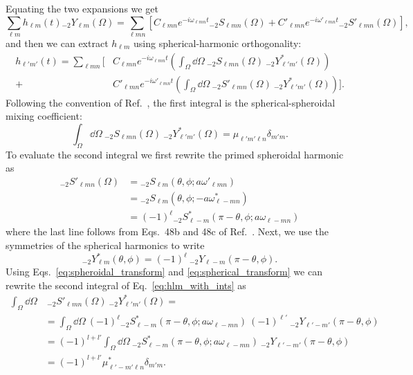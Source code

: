 Equating the two expansions we get
\begin{equation}
    \sum_{\ell m} h_{\ell m}(t) {}_{-2}Y_{\ell m}(\Omega) = \sum_{\ell m n} \left[ C_{\ell m n} e^{-i \omega_{\ell m n} t} {}_{-2}S_{\ell m n}(\Omega) + C'_{\ell m n} e^{-i \omega'_{\ell m n} t} {}_{-2}S'_{\ell m n}(\Omega) \right],
\end{equation}
and then we can extract $h_{\ell m}$ using spherical-harmonic orthogonality:
\begin{align}\label{eq:hlm_with_ints}
    h_{\ell' m'}(t) = \sum_{\ell m n} \bigg[ &C_{\ell m n} e^{-i \omega_{\ell m n} t} \left(\int_\Omega \dd{\Omega} ~ {}_{-2}S_{\ell m n}(\Omega) ~ {}_{-2}Y^*_{\ell' m'}(\Omega)\right) \nonumber \\
    + &C'_{\ell m n} e^{-i \omega'_{\ell m n} t} \left(\int_\Omega \dd{\Omega} ~ {}_{-2}S'_{\ell m n}(\Omega) ~ {}_{-2}Y^*_{\ell' m'}(\Omega)\right) \bigg].
\end{align}
Following the convention of Ref.~\cite{Stein:2019mop}, the first integral is the spherical-spheroidal mixing coefficient:
\begin{equation}
    \int_\Omega \dd{\Omega} ~ {}_{-2}S_{\ell m n}(\Omega) ~ {}_{-2}Y^*_{\ell' m'}(\Omega) = \mu_{\ell' m' \ell n} \delta_{m' m}.
\end{equation}
To evaluate the second integral we first rewrite the primed spheroidal harmonic as 
\begin{align}\label{eq:spheroidal_transform}
    {}_{-2}S'_{\ell m n}(\Omega) &= {}_{-2}S_{\ell m}(\theta, \phi; a\omega'_{\ell m n}) \nonumber \\
    &= {}_{-2}S_{\ell m}(\theta, \phi; -a\omega^*_{\ell -m n}) \nonumber \\
    &= (-1)^\ell {}_{-2}S^*_{\ell -m}(\pi - \theta, \phi; a\omega_{\ell -m n})
\end{align}
where the last line follows from Eqs.~48b and 48c of Ref.~\cite{Cook:2014cta}.
Next, we use the symmetries of the spherical harmonics to write
\begin{equation}\label{eq:spherical_transform}
    {}_{-2}Y^*_{\ell m}(\theta, \phi) = (-1)^{\ell} ~ {}_{-2}Y_{\ell -m}(\pi - \theta, \phi).
\end{equation}
Using Eqs.~\ref{eq:spheroidal_transform} and \ref{eq:spherical_transform} we can rewrite the second integral of Eq.~\ref{eq:hlm_with_ints} as
\begin{align}
    \int_\Omega \dd{\Omega}& ~ {}_{-2}S'_{\ell m n}(\Omega) ~ {}_{-2}Y^*_{\ell' m'}(\Omega) = \nonumber \\ 
    &= \int_\Omega \dd{\Omega} ~ (-1)^\ell {}_{-2}S^*_{\ell -m}(\pi - \theta, \phi; a\omega_{\ell -m n}) ~ (-1)^{\ell'} ~ {}_{-2}Y_{\ell' -m'}(\pi - \theta, \phi) \nonumber \\
    &= (-1)^{l+l'} \int_\Omega \dd{\Omega} ~ {}_{-2}S^*_{\ell -m}(\pi - \theta, \phi; a\omega_{\ell -m n}) ~ {}_{-2}Y_{\ell' -m'}(\pi - \theta, \phi) \nonumber \\
    &= (-1)^{l+l'} \mu^*_{\ell' -m' \ell n} \delta_{m' m}.
\end{align}
